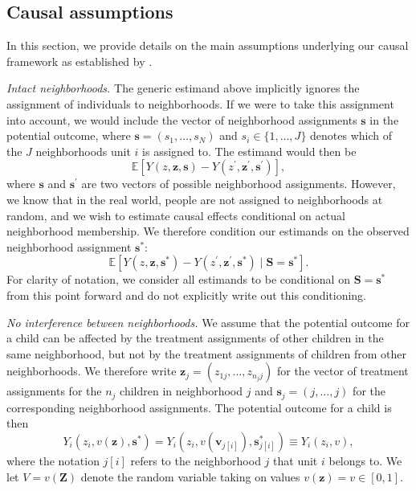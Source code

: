 \documentclass[12pt,a4paper,titlepage]{article}
\begin{document}
\begin{appendices}

\section{Causal assumptions}\label{sec:assumptions}
In this section, we provide details on the main assumptions underlying our causal framework as established by \cite{hong_raudenbush}.
	
\textit{Intact neighborhoods.} The generic estimand above implicitly ignores the assignment of individuals to neighborhoods. If we were to take this assignment into account, we would include the vector of neighborhood assignments $\mathbf{s}$ in the potential outcome, where $\mathbf{s} = (s_1, \ldots, s_N)$ and $s_i \in \{1, \ldots, J\}$ denotes which of the $J$ neighborhoods unit $i$ is assigned to. The estimand would then be
\[
	\mathbb{E}[Y(z, \mathbf{z}, \mathbf{s}) - Y(z^{\prime}, \mathbf{z}^{\prime}, \mathbf{s}^{\prime})],
\]
where $\mathbf{s}$ and $\mathbf{s}^{\prime}$ are two vectors of possible neighborhood assignments. However, we know that in the real world, people are not assigned to neighborhoods at random, and we wish to estimate causal effects conditional on actual neighborhood membership. We therefore condition our estimands on the observed neighborhood assignment $\mathbf{s}^*$:
\[
	\mathbb{E}[Y(z, \mathbf{z}, \mathbf{s}^*) - Y(z^{\prime}, \mathbf{z}^{\prime}, \mathbf{s}^*) \mid \mathbf{S} = \mathbf{s}^*].
\]
For clarity of notation, we consider all estimands to be conditional on $\mathbf{S} = \mathbf{s}^*$ from this point forward and do not explicitly write out this conditioning.

\textit{No interference between neighborhoods.} We assume that the potential outcome for a child can be affected by the treatment assignments of other children in the same neighborhood, but not by the treatment assignments of children from other neighborhoods. We therefore write $\mathbf{z}_j = (z_{1j}, \ldots, z_{n_j j})$ for the vector of treatment assignments for the $n_j$ children in neighborhood $j$ and $\mathbf{s}_j = (j, \ldots, j)$ for the corresponding neighborhood assignments. The potential outcome for a child is then
\[
	Y_i(z_i, v(\mathbf{z}), \mathbf{s}^*) = Y_i(z_i, v(\mathbf{v}_{j[i]}), \mathbf{s}_{j[i]}^*) \equiv Y_i(z_i, v),
\]
where the notation $j[i]$ refers to the neighborhood $j$ that unit $i$ belongs to. We let $V = v(\mathbf{Z})$ denote the random variable taking on values $v(\mathbf{z}) = v \in [0, 1]$.


\end{appendices}
\end{document}
